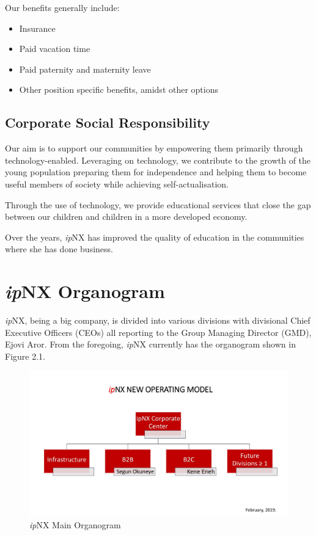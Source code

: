 Our benefits generally include:
\begin{itemize}
	\item Insurance
	\item Paid vacation time
	\item Paid paternity and maternity leave
	\item Other position specific benefits, amidst other options
\end{itemize}
\subsection{Corporate Social Responsibility}
Our aim is to support our communities by empowering them primarily through technology-enabled. Leveraging on technology, we contribute to the growth of the young population preparing them for independence and helping them to become useful members of society while achieving self-actualisation.

Through the use of technology, we provide educational services that close the gap between our children and children in a more developed economy.

Over the years, \textit{ip}NX has improved the quality of education in the communities where she has done business.

\section{\textit{ip}NX Organogram}
\textit{ip}NX, being a big company, is divided into various divisions with divisional Chief Executive Officers (CEOs) all reporting to the Group Managing Director (GMD), Ejovi Aror. From the foregoing, \textit{ip}NX currently has the organogram shown in Figure 2.1.
\begin{figure}[h!]
	\centering
	\includegraphics[width=1\textwidth]{./mainorg}
	\caption{\textit{ip}NX Main Organogram}
\end{figure}

